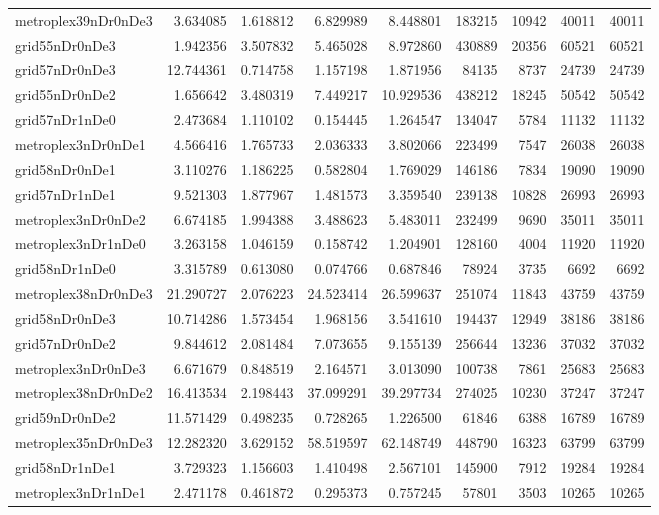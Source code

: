 \begin{longtable}{|l|r|r|r|r|r|r|r|r|}
metroplex39nDr0nDe3 & 3.634085 & 1.618812 & 6.829989 & 8.448801 & 183215 & 10942 & 40011 & 40011 \\
grid55nDr0nDe3 & 1.942356 & 3.507832 & 5.465028 & 8.972860 & 430889 & 20356 & 60521 & 60521 \\
grid57nDr0nDe3 & 12.744361 & 0.714758 & 1.157198 & 1.871956 & 84135 & 8737 & 24739 & 24739 \\
grid55nDr0nDe2 & 1.656642 & 3.480319 & 7.449217 & 10.929536 & 438212 & 18245 & 50542 & 50542 \\
grid57nDr1nDe0 & 2.473684 & 1.110102 & 0.154445 & 1.264547 & 134047 & 5784 & 11132 & 11132 \\
metroplex3nDr0nDe1 & 4.566416 & 1.765733 & 2.036333 & 3.802066 & 223499 & 7547 & 26038 & 26038 \\
grid58nDr0nDe1 & 3.110276 & 1.186225 & 0.582804 & 1.769029 & 146186 & 7834 & 19090 & 19090 \\
grid57nDr1nDe1 & 9.521303 & 1.877967 & 1.481573 & 3.359540 & 239138 & 10828 & 26993 & 26993 \\
metroplex3nDr0nDe2 & 6.674185 & 1.994388 & 3.488623 & 5.483011 & 232499 & 9690 & 35011 & 35011 \\
metroplex3nDr1nDe0 & 3.263158 & 1.046159 & 0.158742 & 1.204901 & 128160 & 4004 & 11920 & 11920 \\
grid58nDr1nDe0 & 3.315789 & 0.613080 & 0.074766 & 0.687846 & 78924 & 3735 & 6692 & 6692 \\
metroplex38nDr0nDe3 & 21.290727 & 2.076223 & 24.523414 & 26.599637 & 251074 & 11843 & 43759 & 43759 \\
grid58nDr0nDe3 & 10.714286 & 1.573454 & 1.968156 & 3.541610 & 194437 & 12949 & 38186 & 38186 \\
grid57nDr0nDe2 & 9.844612 & 2.081484 & 7.073655 & 9.155139 & 256644 & 13236 & 37032 & 37032 \\
metroplex3nDr0nDe3 & 6.671679 & 0.848519 & 2.164571 & 3.013090 & 100738 & 7861 & 25683 & 25683 \\
metroplex38nDr0nDe2 & 16.413534 & 2.198443 & 37.099291 & 39.297734 & 274025 & 10230 & 37247 & 37247 \\
grid59nDr0nDe2 & 11.571429 & 0.498235 & 0.728265 & 1.226500 & 61846 & 6388 & 16789 & 16789 \\
metroplex35nDr0nDe3 & 12.282320 & 3.629152 & 58.519597 & 62.148749 & 448790 & 16323 & 63799 & 63799 \\
grid58nDr1nDe1 & 3.729323 & 1.156603 & 1.410498 & 2.567101 & 145900 & 7912 & 19284 & 19284 \\
metroplex3nDr1nDe1 & 2.471178 & 0.461872 & 0.295373 & 0.757245 & 57801 & 3503 & 10265 & 10265 \\

\end{longtable}
